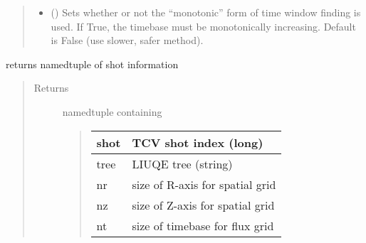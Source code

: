 \documentclass[letterpaper,10pt,english]{sphinxmanual}
\begin{document}
\begin{fulllineitems}
\begin{quote}
\begin{description}
\begin{itemize}
\item {} 
 () \textendash{} Sets whether or not the “monotonic” form of time
window finding is used. If True, the timebase must be monotonically
increasing. Default is False (use slower, safer method).

\end{itemize}

\end{description}\end{quote}

\begin{fulllineitems}
\label{\detokenize{eqtools:eqtools.TCVLIUQE.TCVLIUQETree.getInfo}}
returns namedtuple of shot information
\begin{quote}\begin{description}
\item[{Returns}] \leavevmode

namedtuple containing
\begin{quote}


\begin{savenotes}\sphinxattablestart
\centering
\begin{tabulary}{\linewidth}[t]{|T|T|}
\hline

shot
&
TCV shot index (long)
\\
\hline
tree
&
LIUQE tree (string)
\\
\hline
nr
&
size of R-axis for spatial grid
\\
\hline
nz
&
size of Z-axis for spatial grid
\\
\hline
nt
&
size of timebase for flux grid
\\
\hline
\end{tabulary}
\par
\sphinxattableend\end{savenotes}
\end{quote}


\end{description}\end{quote}

\end{fulllineitems}



\end{fulllineitems}
\end{document}
